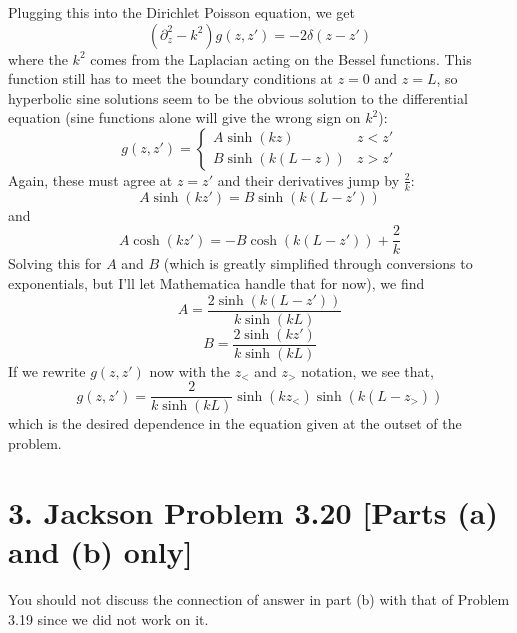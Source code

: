 \documentclass[a4paper,twoside]{article}
\begin{document}
\begin{itemize}
\begin{tcolorbox}[breakable]
            Plugging this into the Dirichlet Poisson equation, we get
            \begin{equation}
                (\partial^2_z - k^2)g(z,z') = -2 \delta(z-z')
            \end{equation}
            where the $ k^2 $ comes from the Laplacian acting on the Bessel functions. This function still has to meet the boundary conditions at $ z = 0 $ and $ z = L $, so hyperbolic sine solutions seem to be the obvious solution to the differential equation (sine functions alone will give the wrong sign on $ k^2 $):
            \begin{equation}
                g(z,z') = \begin{cases} A\sinh(kz) & z<z'\\ B\sinh(k(L-z)) & z>z' \end{cases}
            \end{equation}
            Again, these must agree at $ z = z' $ and their derivatives jump by $ \frac{2}{k} $:
            \begin{equation}
                A\sinh(kz') = B\sinh(k(L-z'))
            \end{equation}
            and
            \begin{equation}
                A\cosh(kz') = -B\cosh(k(L-z')) + \frac{2}{k}
            \end{equation}
            Solving this for $ A $ and $ B $ (which is greatly simplified through conversions to exponentials, but I'll let Mathematica handle that for now), we find
            \begin{equation}
                A = \frac{2\sinh(k(L-z'))}{k\sinh(kL)}
            \end{equation}
            \begin{equation}
                B = \frac{2\sinh(kz')}{k\sinh(kL)}
            \end{equation}
            If we rewrite $ g(z,z') $ now with the $ z_< $ and $ z_> $ notation, we see that,
            \begin{equation}
                g(z,z') = \frac{2}{k\sinh(kL)} \sinh(kz_<)\sinh(k(L-z_>))
            \end{equation}
            which is the desired dependence in the equation given at the outset of the problem.
        \end{tcolorbox}
\end{itemize}


\section*{3. Jackson Problem 3.20 [Parts (a) and (b) only]}
You should not discuss the connection of answer in part (b) with that of Problem 3.19 since we did not work on it.
\end{document}
